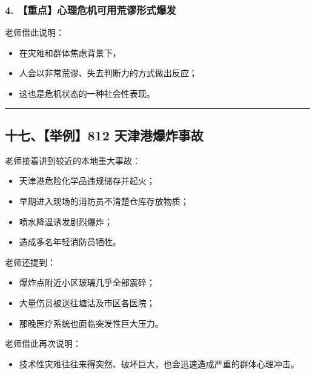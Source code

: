 \documentclass[
  chinese,
  9pt,
  a4paper,
]{ctexart}
\providecommand{\tightlist}{%
  \setlength{\itemsep}{0pt}\setlength{\parskip}{0pt}}
\begin{document}
\subsubsection{4.
【重点】心理危机可用荒谬形式爆发}\label{ux91cdux70b9ux5fc3ux7406ux5371ux673aux53efux7528ux8352ux8c2cux5f62ux5f0fux7206ux53d1}

老师借此说明：

\begin{itemize}
\tightlist
\item
  在灾难和群体焦虑背景下，
\item
  人会以非常荒谬、失去判断力的方式做出反应；
\item
  这也是危机状态的一种社会性表现。
\end{itemize}

\begin{center}\rule{0.5\linewidth}{0.5pt}\end{center}

\subsection{十七、【举例】812
天津港爆炸事故}\label{ux5341ux4e03ux4e3eux4f8b812-ux5929ux6d25ux6e2fux7206ux70b8ux4e8bux6545}

老师接着讲到较近的本地重大事故：

\begin{itemize}
\tightlist
\item
  天津港危险化学品违规储存并起火；
\item
  早期进入现场的消防员不清楚仓库存放物质；
\item
  喷水降温诱发剧烈爆炸；
\item
  造成多名年轻消防员牺牲。
\end{itemize}

老师还提到：

\begin{itemize}
\tightlist
\item
  爆炸点附近小区玻璃几乎全部震碎；
\item
  大量伤员被送往塘沽及市区各医院；
\item
  那晚医疗系统也面临突发性巨大压力。
\end{itemize}

老师借此再次说明：

\begin{itemize}
\tightlist
\item
  技术性灾难往往来得突然、破坏巨大，也会迅速造成严重的群体心理冲击。
\end{itemize}
\end{document}
